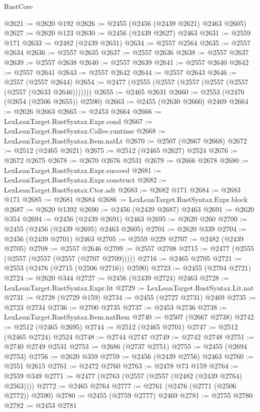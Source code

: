\begin{lexlean}{RustCore}
\begin{coremodule}
@2621 := @2620 @192
@2626 := @2455 (@2456 (@2439 @2621) @2463 @2605)
@2627 := @2620 @123
@2630 := @2456 (@2439 @2627) @2463
@2631 := @2559 @171
@2633 := @2482 (@2439 @2631)
@2634 := @2557 @2564
@2635 := @2557 @2634
@2636 := @2557 @2635
@2637 := @2557 @2636
@2638 := @2557 @2637
@2639 := @2557 @2638
@2640 := @2557 @2639
@2641 := @2557 @2640
@2642 := @2557 @2641
@2643 := @2557 @2642
@2644 := @2557 @2643
@2646 := @2557 (@2557 @2644)
@2654 := @2477 (@2555 (@2557 (@2557 (@2557 (@2557 (@2557 (@2633 @2646)))))))
@2655 := @2465 @2631
@2660 := @2553 (@2476 (@2654 (@2506 @2655)) @2590)
@2663 := @2455 (@2630 @2660) @2469
@2664 := @2626 @2663
@2665 := @2453 @2664
@2666 := LexLeanTarget.RustSyntax.Expr.cond
@2667 := LexLeanTarget.RustSyntax.Callee.runtime
@2668 := LexLeanTarget.RustSyntax.Item.natLt
@2670 := @2507 (@2667 @2668)
@2672 := @2512 (@2465 @2621)
@2675 := @2512 (@2465 @2627) @2524
@2676 := @2672 @2675
@2678 := @2670 @2676 @2531
@2679 := @2666 @2678
@2680 := LexLeanTarget.RustSyntax.Expr.succeed
@2681 := LexLeanTarget.RustSyntax.Expr.construct
@2682 := LexLeanTarget.RustSyntax.Ctor.adt
@2683 := @2682 @171
@2684 := @2683 @171
@2685 := @2681 @2684
@2686 := LexLeanTarget.RustSyntax.Expr.block
@2687 := @2620 @1392
@2690 := @2456 (@2439 @2687) @2463
@2691 := @2620 @354
@2694 := @2456 (@2439 @2691) @2463
@2695 := @2620 @260
@2700 := @2455 (@2456 (@2439 @2695) @2463 @2605)
@2701 := @2620 @339
@2704 := @2456 (@2439 @2701) @2463
@2705 := @2559 @229
@2707 := @2482 (@2439 @2705)
@2708 := @2557 @2646
@2709 := @2557 @2708
@2715 := @2477 (@2555 (@2557 (@2557 (@2557 (@2707 @2709)))))
@2716 := @2465 @2705
@2721 := @2553 (@2476 (@2715 (@2506 @2716)) @2590)
@2723 := @2455 (@2704 @2721)
@2724 := @2620 @344
@2727 := @2456 (@2439 @2724) @2463
@2728 := LexLeanTarget.RustSyntax.Expr.lit
@2729 := LexLeanTarget.RustSyntax.Lit.nat
@2731 := @2728 (@2729 @159)
@2734 := @2455 (@2727 @2731) @2469
@2735 := @2723 @2734
@2736 := @2700 @2735
@2737 := @2453 @2736
@2738 := LexLeanTarget.RustSyntax.Item.natRem
@2740 := @2507 (@2667 @2738)
@2742 := @2512 (@2465 @2695)
@2744 := @2512 (@2465 @2701)
@2747 := @2512 (@2465 @2724) @2524
@2748 := @2744 @2747
@2749 := @2742 @2748
@2751 := @2740 @2749 @2531
@2753 := @2686 (@2737 @2751)
@2755 := @2455 (@2694 @2753)
@2756 := @2620 @359
@2759 := @2456 (@2439 @2756) @2463
@2760 := @2551 @2615
@2761 := @2472 @2760
@2763 := @2478 @73 @159
@2764 := @2559 @349
@2771 := @2477 (@2763 (@2557 (@2557 (@2482 (@2439 @2764) @2563))))
@2772 := @2465 @2764
@2777 := @2761 (@2476 (@2771 (@2506 @2772)) @2590)
@2780 := @2455 (@2759 @2777) @2469
@2781 := @2755 @2780
@2782 := @2453 @2781

\end{coremodule}
\end{lexlean}
